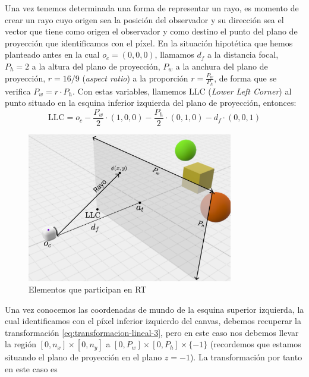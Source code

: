 Una vez tenemos determinada una forma de representar un rayo, es momento de crear un rayo cuyo origen sea la posición del observador y su dirección sea el vector que tiene como origen el observador y como destino el punto del plano de proyección que identificamos con el píxel. En la situación hipotética que hemos planteado antes en la cual $o_c=(0,0,0)$, llamamos $d_f$ a la distancia focal, $P_h=2$ a la altura del plano de proyección, $P_w$ a la anchura del plano de proyección, $r = 16/9$ (\textit{aspect ratio}) a la proporción $r = \frac{P_w}{P_h}$, de forma que se verifica $P_w=r\cdot P_h$. Con estas variables, llamemos $\mathrm{LLC}$ (\textit{Lower Left Corner}) al punto situado en la esquina inferior izquierda del plano de proyección, entonces:
\begin{equation}
    \label{eq:LLC-inicial}
    \mathrm{LLC} = o_c - \frac{P_w}{2}\cdot(1,0,0) - \frac{P_h}{2}\cdot(0,1,0) - d_f \cdot (0,0,1)
\end{equation}

\begin{figure} [ht]
    \centering
    \includegraphics[width=9cm]{img/C8/elementos-PP.png}
    \caption{Elementos que participan en RT}
    \label{fig:elementos}
\end{figure}

Una vez conocemos las coordenadas de mundo de la esquina superior izquierda, la cual identificamos con el píxel inferior izquierdo del canvas, debemos recuperar la transformación \ref{eq:transformacion-lineal-3}, pero en este caso nos debemos llevar la región $[0,n_x]\times[0,n_y]$ a $[0,P_w]\times[0,P_h]\times\{-1\}$ (recordemos que estamos situando el plano de proyección en el plano $z=-1$). La transformación por tanto en este caso es

